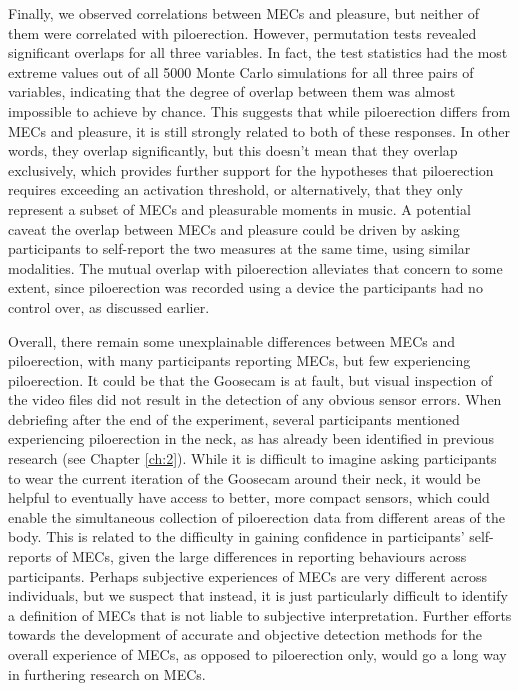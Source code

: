 Finally, we observed correlations between MECs and pleasure, but neither of them were correlated with piloerection. However, permutation tests revealed significant overlaps for all three variables. In fact, the test statistics had the most extreme values out of all 5000 Monte Carlo simulations for all three pairs of variables, indicating that the degree of overlap between them was almost impossible to achieve by chance. This suggests that while piloerection differs from MECs and pleasure, it is still strongly related to both of these responses. In other words, they overlap significantly, but this doesn't mean that they overlap exclusively, which provides further support for the hypotheses that piloerection requires exceeding an activation threshold, or alternatively, that they only represent a subset of MECs and pleasurable moments in music. A potential caveat the overlap between MECs and pleasure could be driven by asking participants to self-report the two measures at the same time, using similar modalities. The mutual overlap with piloerection alleviates that concern to some extent, since piloerection was recorded using a device the participants had no control over, as discussed earlier.

Overall, there remain some unexplainable differences between MECs and piloerection, with many participants reporting MECs, but few experiencing piloerection. It could be that the Goosecam is at fault, but visual inspection of the video files did not result in the detection of any obvious sensor errors. When debriefing after the end of the experiment, several participants mentioned experiencing piloerection in the neck, as has already been identified in previous research (see Chapter \ref{ch:2}). While it is difficult to imagine asking participants to wear the current iteration of the Goosecam around their neck, it would be helpful to eventually have access to better, more compact sensors, which could enable the simultaneous collection of piloerection data from different areas of the body. This is related to the difficulty in gaining confidence in participants' self-reports of MECs, given the large differences in reporting behaviours across participants. Perhaps subjective experiences of MECs are very different across individuals, but we suspect that instead, it is just particularly difficult to identify a definition of MECs that is not liable to subjective interpretation. Further efforts towards the development of accurate and objective detection methods for the overall experience of MECs, as opposed to piloerection only, would go a long way in furthering research on MECs.

